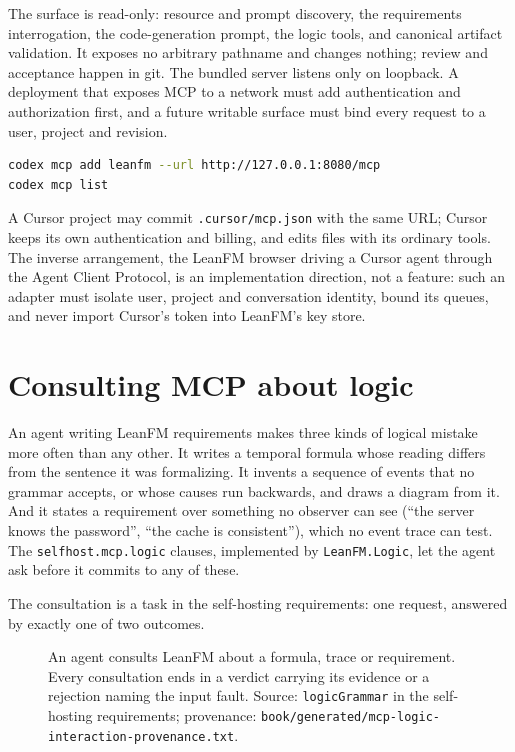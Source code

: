 The surface is read-only: resource and prompt discovery, the requirements
interrogation, the code-generation prompt, the logic tools, and canonical
artifact validation. It exposes no arbitrary pathname and changes nothing; review
and acceptance happen in git. The bundled server listens only on loopback. A
deployment that exposes MCP to a network must add authentication and
authorization first, and a future writable surface must bind every request to a
user, project and revision.

\begin{lstlisting}[language=bash]
codex mcp add leanfm --url http://127.0.0.1:8080/mcp
codex mcp list
\end{lstlisting}

A Cursor project may commit \texttt{.cursor/mcp.json} with the same URL; Cursor
keeps its own authentication and billing, and edits files with its ordinary
tools. The inverse arrangement, the LeanFM browser driving a Cursor agent through
the Agent Client Protocol, is an implementation direction, not a feature: such an
adapter must isolate user, project and conversation identity, bound its queues,
and never import Cursor's token into LeanFM's key store.

\section{Consulting MCP about logic}
\label{sec:mcp-logic}

An agent writing LeanFM requirements makes three kinds of logical mistake more
often than any other. It writes a temporal formula whose reading differs from the
sentence it was formalizing. It invents a sequence of events that no grammar
accepts, or whose causes run backwards, and draws a diagram from it. And it
states a requirement over something no observer can see (``the server knows the
password'', ``the cache is consistent''), which no event trace can test. The
\texttt{selfhost.mcp.logic} clauses, implemented by \texttt{LeanFM.Logic}, let the
agent ask before it commits to any of these.

The consultation is a task in the self-hosting requirements: one request,
answered by exactly one of two outcomes.

\begin{figure}[htbp]
\centering
\resizebox{0.85\textwidth}{!}{}
\caption{An agent consults LeanFM about a formula, trace or requirement. Every
consultation ends in a verdict carrying its evidence or a rejection naming the
input fault. Source: \texttt{logicGrammar} in the self-hosting requirements;
provenance: \texttt{book/generated/mcp-logic-interaction-provenance.txt}.}
\label{fig:mcp-logic-interaction}
\end{figure}

